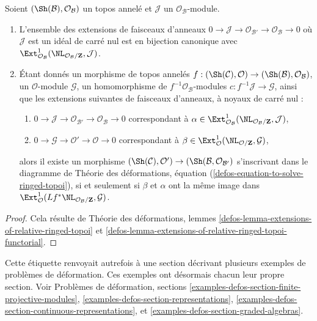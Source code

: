 \begin{lemma}
\label{lemma-extensions-of-ringed-topoi}
Soient $(\Sh(\mathcal{B}), \mathcal{O}_\mathcal{B})$ un topos annelé
et $\mathcal{J}$ un $\mathcal{O}_\mathcal{B}$-module.
\begin{enumerate}
\item L'ensemble des extensions de faisceaux d'anneaux
$0 \to \mathcal{J} \to \mathcal{O}_{\mathcal{B}'} \to
\mathcal{O}_\mathcal{B} \to 0$
où $\mathcal{J}$ est un idéal de carré nul est en bijection canonique avec
$\Ext^1_{\mathcal{O}_\mathcal{B}}(
\NL_{\mathcal{O}_\mathcal{B}/\mathbf{Z}}, \mathcal{J})$.
\item Étant donnés un morphisme de topos annelés
$f : (\Sh(\mathcal{C}), \mathcal{O}) \to
(\Sh(\mathcal{B}), \mathcal{O}_\mathcal{B})$, un $\mathcal{O}$-module
$\mathcal{G}$, un homomorphisme de $f^{-1}\mathcal{O}_\mathcal{B}$-modules
$c : f^{-1}\mathcal{J} \to \mathcal{G}$, ainsi que les extensions suivantes
de faisceaux d'anneaux, à noyaux de carré nul :
\begin{enumerate}
\item[(a)] $0 \to \mathcal{J} \to \mathcal{O}_{\mathcal{B}'} \to
\mathcal{O}_\mathcal{B} \to 0$ correspondant à
$\alpha \in \Ext^1_{\mathcal{O}_\mathcal{B}}(
\NL_{\mathcal{O}_\mathcal{B}/\mathbf{Z}}, \mathcal{J})$,
\item[(b)] $0 \to \mathcal{G} \to \mathcal{O}' \to \mathcal{O} \to 0$
correspondant à
$\beta \in \Ext^1_\mathcal{O}(\NL_{\mathcal{O}/\mathbf{Z}}, \mathcal{G})$,
\end{enumerate}
alors il existe un morphisme $(\Sh(\mathcal{C}), \mathcal{O}') \to
(\Sh(\mathcal{B}, \mathcal{O}_{\mathcal{B}'})$ s'inscrivant dans
le diagramme de Théorie des déformations, équation (\ref{defos-equation-to-solve-ringed-topoi}),
si et seulement si $\beta$ et $\alpha$ ont la même image dans
$\Ext^1_\mathcal{O}(
Lf^*\NL_{\mathcal{O}_\mathcal{B}/\mathbf{Z}}, \mathcal{G})$.
\end{enumerate}
\end{lemma}

\begin{proof}
Cela résulte de Théorie des déformations, lemmes
\ref{defos-lemma-extensions-of-relative-ringed-topoi} et
\ref{defos-lemma-extensions-of-relative-ringed-topoi-functorial}.
\end{proof}

\begin{remark}
\label{remark-examples-formal-defos}
Cette étiquette renvoyait autrefois à une section décrivant plusieurs exemples
de problèmes de déformation. Ces exemples ont désormais chacun leur propre section.
Voir Problèmes de déformation, sections
\ref{examples-defos-section-finite-projective-modules},
\ref{examples-defos-section-representations},
\ref{examples-defos-section-continuous-representations}, et
\ref{examples-defos-section-graded-algebras}.
\end{remark}

